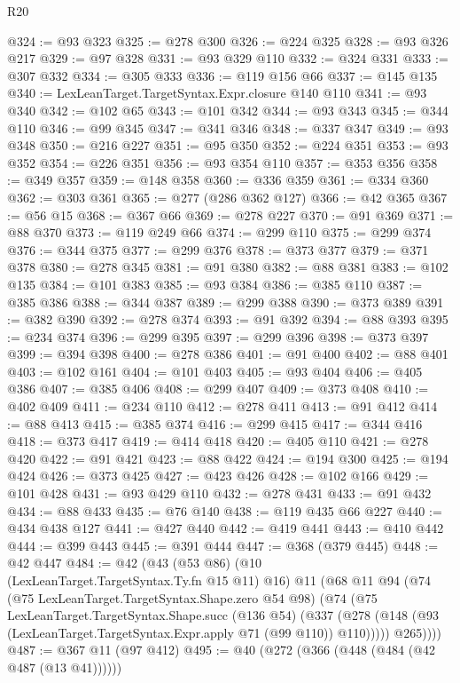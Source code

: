 \begin{lexlean}{R20}
\begin{coremodule}
@324 := @93 @323
@325 := @278 @300
@326 := @224 @325
@328 := @93 @326 @217
@329 := @97 @328
@331 := @93 @329 @110
@332 := @324 @331
@333 := @307 @332
@334 := @305 @333
@336 := @119 @156 @66
@337 := @145 @135
@340 := LexLeanTarget.TargetSyntax.Expr.closure @140 @110
@341 := @93 @340
@342 := @102 @65
@343 := @101 @342
@344 := @93 @343
@345 := @344 @110
@346 := @99 @345
@347 := @341 @346
@348 := @337 @347
@349 := @93 @348
@350 := @216 @227
@351 := @95 @350
@352 := @224 @351
@353 := @93 @352
@354 := @226 @351
@356 := @93 @354 @110
@357 := @353 @356
@358 := @349 @357
@359 := @148 @358
@360 := @336 @359
@361 := @334 @360
@362 := @303 @361
@365 := @277 (@286 @362 @127)
@366 := @42 @365
@367 := @56 @15
@368 := @367 @66
@369 := @278 @227
@370 := @91 @369
@371 := @88 @370
@373 := @119 @249 @66
@374 := @299 @110
@375 := @299 @374
@376 := @344 @375
@377 := @299 @376
@378 := @373 @377
@379 := @371 @378
@380 := @278 @345
@381 := @91 @380
@382 := @88 @381
@383 := @102 @135
@384 := @101 @383
@385 := @93 @384
@386 := @385 @110
@387 := @385 @386
@388 := @344 @387
@389 := @299 @388
@390 := @373 @389
@391 := @382 @390
@392 := @278 @374
@393 := @91 @392
@394 := @88 @393
@395 := @234 @374
@396 := @299 @395
@397 := @299 @396
@398 := @373 @397
@399 := @394 @398
@400 := @278 @386
@401 := @91 @400
@402 := @88 @401
@403 := @102 @161
@404 := @101 @403
@405 := @93 @404
@406 := @405 @386
@407 := @385 @406
@408 := @299 @407
@409 := @373 @408
@410 := @402 @409
@411 := @234 @110
@412 := @278 @411
@413 := @91 @412
@414 := @88 @413
@415 := @385 @374
@416 := @299 @415
@417 := @344 @416
@418 := @373 @417
@419 := @414 @418
@420 := @405 @110
@421 := @278 @420
@422 := @91 @421
@423 := @88 @422
@424 := @194 @300
@425 := @194 @424
@426 := @373 @425
@427 := @423 @426
@428 := @102 @166
@429 := @101 @428
@431 := @93 @429 @110
@432 := @278 @431
@433 := @91 @432
@434 := @88 @433
@435 := @76 @140
@438 := @119 @435 @66 @227
@440 := @434 @438 @127
@441 := @427 @440
@442 := @419 @441
@443 := @410 @442
@444 := @399 @443
@445 := @391 @444
@447 := @368 (@379 @445)
@448 := @42 @447
@484 := @42
    (@43
      (@53 @86)
      (@10 (LexLeanTarget.TargetSyntax.Ty.fn @15 @11) @16)
      @11
      (@68
        @11
        @94
        (@74
          (@75 LexLeanTarget.TargetSyntax.Shape.zero @54 @98)
          (@74
            (@75
              LexLeanTarget.TargetSyntax.Shape.succ
              (@136 @54)
              (@337
                (@278 (@148 (@93 (LexLeanTarget.TargetSyntax.Expr.apply @71 (@99 @110)) @110)))))
            @265))))
@487 := @367 @11 (@97 @412)
@495 := @40 (@272 (@366 (@448 (@484 (@42 @487 (@13 @41))))))

\end{coremodule}
\end{lexlean}
